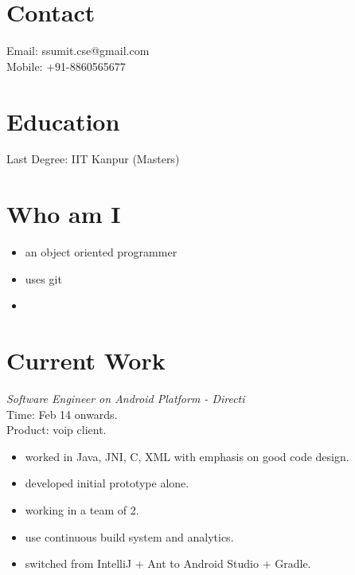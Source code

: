 \documentclass[margin,line]{resume}
\begin{document}
\begin{resume}

    \section{\mysidestyle Contact}
    	Email: ssumit.cse@gmail.com\\
    	Mobile: +91-8860565677\\

    \section{\mysidestyle Education}
	Last Degree: IIT Kanpur (Masters)

    \section{\mysidestyle Who am I}
	\begin{itemize}
		\item an object oriented programmer
		\item uses git
		\item 
	\end{itemize}



    \section{\mysidestyle Current Work}

\textit{Software Engineer on Android Platform - Directi} \\
Time: Feb 14 onwards.\\
Product: voip client.\\
\begin{itemize}
	\item worked in Java, JNI, C, XML with emphasis on good code design.
        \item developed initial prototype alone.
        \item working in a team of 2.
	\item use continuous build system and analytics.
	\item switched from IntelliJ + Ant to Android Studio + Gradle.
 \end{itemize}


\end{resume}
\end{document}
